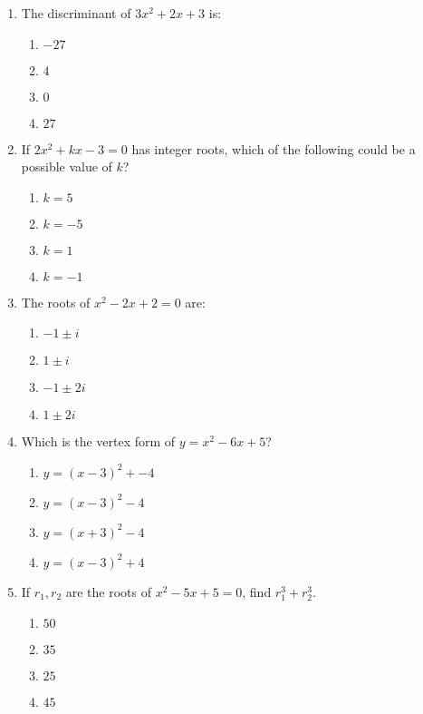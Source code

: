 \documentclass[12pt]{article}
\begin{document}
\begin{enumerate}
\item The discriminant of \(3x^2 + 2x + 3\) is:

\begin{enumerate}
  \item \(-27\)
  \item \(4\)
  \item \(0\)
  \item \(27\)
\end{enumerate}

\item If \(2x^2 + kx - 3 = 0\) has integer roots, which of the following could be a possible value of \(k\)?

\begin{enumerate}
  \item \(k = 5\)
  \item \(k = -5\)
  \item \(k = 1\)
  \item \(k = -1\)
\end{enumerate}

\item The roots of \(x^2 - 2x + 2 = 0\) are:

\begin{enumerate}
  \item \(-1 \pm i\)
  \item \(1 \pm i\)
  \item \(-1 \pm 2i\)
  \item \(1 \pm 2i\)
\end{enumerate}

\item Which is the vertex form of \(y = x^2 - 6x + 5\)?

\begin{enumerate}
  \item \(y = (x-3)^2 + -4\)
  \item \(y = (x-3)^2 - 4\)
  \item \(y = (x+3)^2 - 4\)
  \item \(y = (x-3)^2 + 4\)
\end{enumerate}

\item If \(r_1, r_2\) are the roots of \(x^2 - 5x + 5 = 0\), find \(r_1^3 + r_2^3\).

\begin{enumerate}
  \item \(50\)
  \item \(35\)
  \item \(25\)
  \item \(45\)
\end{enumerate}


\end{enumerate}
\end{document}
